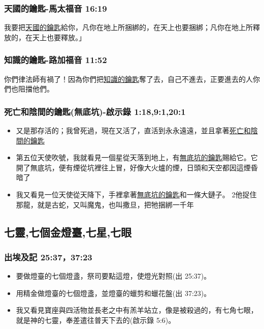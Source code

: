 \subsubsection{天國的鑰匙-馬太福音 16:19}
我要把\underline{天國的鑰匙}給你，凡你在地上所捆綁的，在天上也要捆綁；凡你在地上所釋放的，在天上也要釋放。」

\subsubsection{知識的鑰匙-路加福音 11:52}
你們律法師有禍了！因為你們把\underline{知識的鑰匙}奪了去，自己不進去，正要進去的人你們也阻擋他們。


\subsubsection{死亡和陰間的鑰匙(無底坑)-啟示錄 1:18,9:1,20:1}
\begin{itemize} 
\itemsep-.25em
\item 又是那存活的；我曾死過，現在又活了，直活到永永遠遠，並且拿著\underline{死亡和陰間的鑰匙} 
\item 第五位天使吹號，我就看見一個星從天落到地上，有\underline{無底坑的鑰匙}賜給它。它開了無底坑，便有煙從坑裡往上冒，好像大火爐的煙，日頭和天空都因這煙昏暗了
\item 我又看見一位天使從天降下，手裡拿著\underline{無底坑的鑰匙}和一條大鏈子。 2他捉住那龍，就是古蛇，又叫魔鬼，也叫撒旦，把牠捆綁一千年
\end{itemize} 


\subsection{七靈,七個金燈臺,七星,七眼}
\subsubsection{出埃及記 25:37，37:23}
\begin{itemize} 
\itemsep-.25em
\item 要做燈臺的七個燈盞，祭司要點這燈，使燈光對照(出 25:37)。
\item 用精金做燈臺的七個燈盞，並燈臺的蠟剪和蠟花盤(出 37:23)。
\item 我又看見寶座與四活物並長老之中有羔羊站立，像是被殺過的，有七角七眼，就是神的七靈，奉差遣往普天下去的(啟示錄 5:6)。
\end{itemize} 

